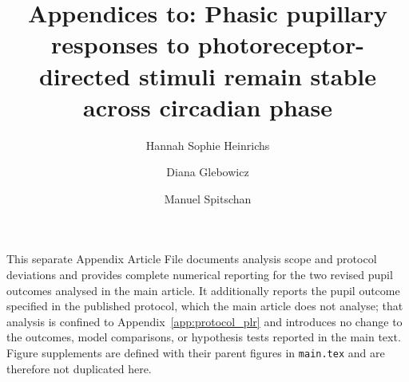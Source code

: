 \documentclass[9pt,lineno]{elife}
\begin{document}
\title{Appendices to: Phasic pupillary responses to photoreceptor-directed stimuli remain stable across circadian phase}

\author[1,2]{Hannah Sophie Heinrichs}
\author[1]{Diana Glebowicz}
\author[1,2,3,4*]{Manuel Spitschan}



\maketitle

\noindent This separate Appendix Article File documents analysis scope and protocol deviations and provides complete numerical reporting for the two revised pupil outcomes analysed in the main article. It additionally reports the pupil outcome specified in the published protocol, which the main article does not analyse; that analysis is confined to Appendix~\ref{app:protocol_plr} and introduces no change to the outcomes, model comparisons, or hypothesis tests reported in the main text. Figure supplements are defined with their parent figures in \texttt{main.tex} and are therefore not duplicated here.


\end{document}
